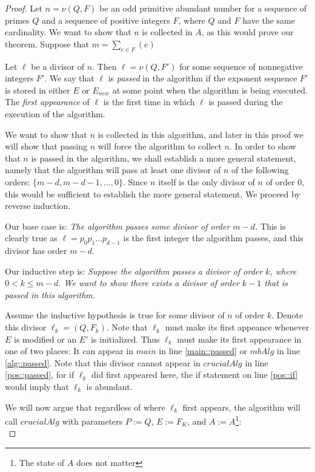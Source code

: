 \documentclass[../paper.tex]{subfiles}
\begin{document}
\begin{proof}
  Let $n = \nu (Q, F)$ be an odd primitive abundant number for a
sequence of primes $Q$ and a sequence of positive integers $F$,
where $Q$ and $F$ have the same cardinality. We want to show that
$n$ is collected in $A$, as this would prove our theorem.
Suppose that $m = \sum_{e \in F}(e)$

  Let $\ell$ be a divisor of $n$. Then $\ell = \nu (Q, F')$ for
some sequence of nonnegative integers $F'$. We say that $\ell$ is
\textit{passed} in the algorithm if the exponent sequence $F'$ is
stored in either $E$ or $E_{new}$ at some point when the algorithm is
being executed. The \textit{first appearance} of $\ell$ is the
first time in which $\ell$ is passed during the execution of the
algorithm.

  We want to show that $n$ is collected in this algorithm, and
later in this proof we will show that passing $n$ will force the
algorithm to collect $n$. In
order to show that $n$ is passed in the algorithm, we shall establish
a more general statement, namely that the algorithm will pass at least
one divisor of $n$ of the following orders: $\{m-d, m-d-1, ..., 0\}$.
Since $n$ itself is the only divisor of $n$ of order 0, this would be 
sufficient to establish the more general statement. We proceed by 
reverse induction.

Our base case is: \textit{The algorithm passes some divisor of order $m
- d$.} This is clearly true as $\ell = p_0 p_1 ... p_{d-1}$ is the 
first integer the algorithm passes, and this divisor has order 
$m-d$.

Our inductive step is:
\textit{Suppose the algorithm passes a divisor of order $k$,
where $0 < k \leq m - d $. We want to show there exists a divisor
of order $k - 1$ that is passed in this algorithm.}

Assume the inductive hypothesis is true for some divisor of $n$ of
order $k$. Denote this divisor $\ell_k = (Q, F_k)$. Note that
$\ell_k$ must make its first appeance whenever $E$ is modified
or an $E'$ is initialized. Thus $\ell_k$ must make its first
appearance in one of two places: It can appear in $main$ in
line \ref{main::passed} or $mbAlg$ in line \ref{alg::passed}. 
Note that this divisor cannot appear in $crucialAlg$ in line
\ref{pos::passed}, for if $\ell_k$ did first appeared here, 
the if statement on line \ref{pos::if} would imply that $\ell_k$
is abundant.  

  We will now argue that regardless of where $\ell_k$ first
appears, the algorithm will call $crucialAlg$ with
parameters $P:= Q$, $E := F_K$, and $A := A$\footnote{The state of
$A$ does not matter}:
\\


\end{proof}
\end{document}
